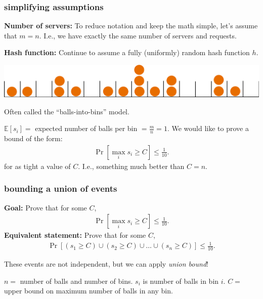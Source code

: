 \documentclass[compress]{beamer}
\newcommand{\E}{\mathbb{E}}
\begin{document}
\begin{frame}
	\frametitle{simplifying assumptions}
	\textbf{Number of servers:} To reduce notation and keep the math simple, let's assume that $m = n$. I.e., we have exactly the same number of servers and requests. 
	
	\textbf{Hash function:} Continue to assume a fully (uniformly) random hash function $h$.
	
	\begin{center}
		\includegraphics[width=.8\textwidth]{balls_into_bins.png}
		
		Often called the ``balls-into-bins'' model. 
	\end{center}
	
	$\E[s_i] = $ expected number of balls per bin $=\frac{m}{n} = 1$. We would like to prove a bound of the form:
	\begin{align*}
		\Pr[\max_i s_i \geq C] \leq \frac{1}{10}. 
	\end{align*}
	for as tight a value of $C$. I.e., something much better than $C = n$. 
\end{frame}

\begin{frame}
	\frametitle{bounding a union of events}
	\textbf{Goal:} Prove that for some $C$,
	\begin{align*}
		\Pr[\max_i s_i \geq C] \leq \frac{1}{10}. 
	\end{align*}	
	\textbf{Equivalent statement:} Prove that for some $C$, 
	\begin{align*}
		\Pr[(s_1 \geq C) \cup (s_2 \geq C) \cup \ldots \cup (s_n \geq C)] \leq \frac{1}{10}. 
	\end{align*}

	These events are not independent, but we can apply \emph{union bound}!

	\vspace{1em}
	\begin{block}{\vspace*{-3ex}}
		\small $n = $ number of balls and number of bins. $s_i$ is number of balls in bin $i$. $C =$ upper bound on maximum number of balls in any bin.
	\end{block}
\end{frame}
\end{document}
